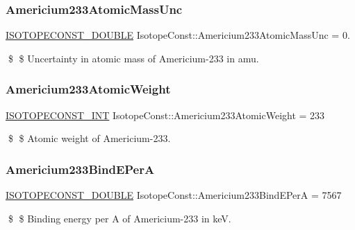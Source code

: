 \subsubsection{\texorpdfstring{Americium233\+Atomic\+Mass\+Unc}{Americium233AtomicMassUnc}}
{\footnotesize\ttfamily \mbox{\hyperlink{group___isotope_const-_macros_ga8f45a7272ce02c0b4c65c44636ed719a}{I\+S\+O\+T\+O\+P\+E\+C\+O\+N\+S\+T\+\_\+\+D\+O\+U\+B\+LE}} Isotope\+Const\+::\+Americium233\+Atomic\+Mass\+Unc = 0.}

\$ \$ Uncertainty in atomic mass of Americium-\/233 in amu. \mbox{\label{group___isotope_const-_americium-_am233_ga3653d8f7069c15fb21db2a1b3774d746}} 
\subsubsection{\texorpdfstring{Americium233\+Atomic\+Weight}{Americium233AtomicWeight}}
{\footnotesize\ttfamily \mbox{\hyperlink{group___isotope_const-_macros_ga5f18360b3e99483a35c32d789e62621c}{I\+S\+O\+T\+O\+P\+E\+C\+O\+N\+S\+T\+\_\+\+I\+NT}} Isotope\+Const\+::\+Americium233\+Atomic\+Weight = 233}

\$ \$ Atomic weight of Americium-\/233. \mbox{\label{group___isotope_const-_americium-_am233_gab38863b26cc5396e70076c26e6c8fda3}} 
\subsubsection{\texorpdfstring{Americium233\+Bind\+E\+PerA}{Americium233BindEPerA}}
{\footnotesize\ttfamily \mbox{\hyperlink{group___isotope_const-_macros_ga8f45a7272ce02c0b4c65c44636ed719a}{I\+S\+O\+T\+O\+P\+E\+C\+O\+N\+S\+T\+\_\+\+D\+O\+U\+B\+LE}} Isotope\+Const\+::\+Americium233\+Bind\+E\+PerA = 7567}

\$ \$ Binding energy per A of Americium-\/233 in keV. \mbox{\label{group___isotope_const-_americium-_am233_ga7858bf921f7f487ef6cb1eb74f808697}} 

